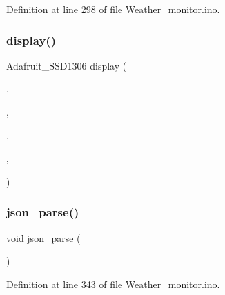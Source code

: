 Definition at line 298 of file Weather\+\_\+monitor.\+ino.

\mbox{\label{_weather__monitor_8ino_a1671c15ea8b66182fa3e462ac06caf2d}} 
\subsubsection{\texorpdfstring{display()}{display()}}
{\footnotesize\ttfamily Adafruit\+\_\+\+S\+S\+D1306 display (\begin{DoxyParamCaption}\item[{\hyperlink{_weather__monitor_8ino_a9065e33a0ffff5f88cb1bb46e2bb38f3}{O\+L\+E\+D\+\_\+\+M\+O\+SI}}]{,  }\item[{\hyperlink{_weather__monitor_8ino_a8ada351153327868280ab3e62367f927}{O\+L\+E\+D\+\_\+\+C\+LK}}]{,  }\item[{\hyperlink{_weather__monitor_8ino_ab92f2aedff7d366df56a26b3c9c9d795}{O\+L\+E\+D\+\_\+\+DC}}]{,  }\item[{\hyperlink{_weather__monitor_8ino_a619e07239fb3b9b14d40646ab41d5b4f}{O\+L\+E\+D\+\_\+\+R\+E\+S\+ET}}]{,  }\item[{\hyperlink{_weather__monitor_8ino_ab68a9b3dbffcafd9849e74c4998b8840}{O\+L\+E\+D\+\_\+\+CS}}]{ }\end{DoxyParamCaption})}

\mbox{\label{_weather__monitor_8ino_a9fca7a32c7752a91c7f2b80ac424ae0e}} 
\subsubsection{\texorpdfstring{json\+\_\+parse()}{json\_parse()}}
{\footnotesize\ttfamily void json\+\_\+parse (\begin{DoxyParamCaption}{ }\end{DoxyParamCaption})}



Definition at line 343 of file Weather\+\_\+monitor.\+ino.

\mbox{\label{_weather__monitor_8ino_afe461d27b9c48d5921c00d521181f12f}} 
